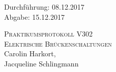 

\begin{titlepage}
  \begin{flushleft}
 Durchführung: 08.12.2017\\
 Abgabe: 15.12.2017
  \end{flushleft}



 \begin{center}


\textsc{\LARGE Praktikumsprotokoll V302}\\[1.5cm]
\textsc{\huge Elektrische Brückenschaltungen } \\[5,5cm]

Carolin Harkort\footnotemark[1], \\
Jacqueline Schlingmann\footnotemark[2] \\[1,0cm]



 \end{center}

 \vfill

\end{titlepage}


  
  
  

\nocite{*}
\printbibliography

